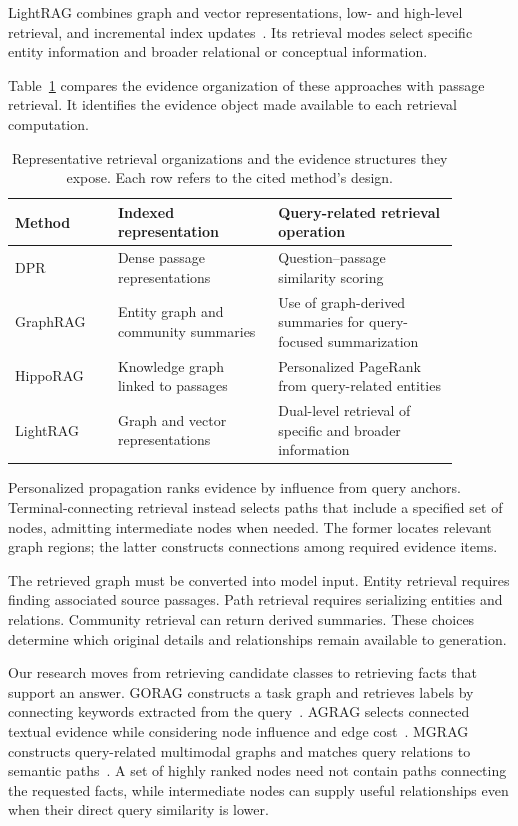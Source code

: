 LightRAG combines graph and vector representations, low- and high-level retrieval, and incremental index updates~\cite{bg-lightrag}. Its retrieval modes select specific entity information and broader relational or conceptual information.

Table~\ref{tab:background:retrieval-units} compares the evidence organization of these approaches with passage retrieval. It identifies the evidence object made available to each retrieval computation.

\begin{table}[tbp]
\centering
\caption{Representative retrieval organizations and the evidence structures they expose. Each row refers to the cited method's design.}
\label{tab:background:retrieval-units}
\small
\begin{tabular}{p{0.20\linewidth}p{0.32\linewidth}p{0.36\linewidth}}
\toprule
Method&Indexed representation&Query-related retrieval operation\\
\midrule
DPR~\cite{bg-dpr}&Dense passage representations&Question--passage similarity scoring\\
GraphRAG~\cite{bg-graphrag}&Entity graph and community summaries&Use of graph-derived summaries for query-focused summarization\\
HippoRAG~\cite{bg-hipporag}&Knowledge graph linked to passages&Personalized PageRank from query-related entities\\
LightRAG~\cite{bg-lightrag}&Graph and vector representations&Dual-level retrieval of specific and broader information\\
\bottomrule
\end{tabular}
\end{table}

Personalized propagation ranks evidence by influence from query anchors. Terminal-connecting retrieval instead selects paths that include a specified set of nodes, admitting intermediate nodes when needed. The former locates relevant graph regions; the latter constructs connections among required evidence items.

The retrieved graph must be converted into model input. Entity retrieval requires finding associated source passages. Path retrieval requires serializing entities and relations. Community retrieval can return derived summaries. These choices determine which original details and relationships remain available to generation.

Our research moves from retrieving candidate classes to retrieving facts that support an answer. GORAG constructs a task graph and retrieves labels by connecting keywords extracted from the query~\cite{bg-gorag}. AGRAG selects connected textual evidence while considering node influence and edge cost~\cite{bg-agrag}. MGRAG constructs query-related multimodal graphs and matches query relations to semantic paths~\cite{bg-mgrag}. A set of highly ranked nodes need not contain paths connecting the requested facts, while intermediate nodes can supply useful relationships even when their direct query similarity is lower.

